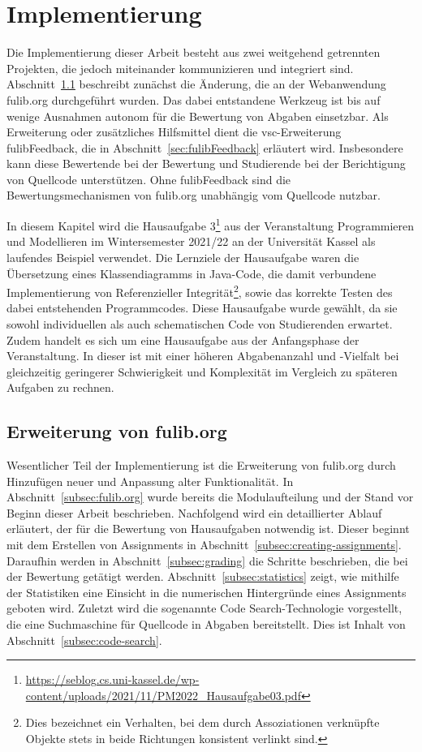 \chapter{Implementierung}\label{ch:implementation}

Die Implementierung dieser Arbeit besteht aus zwei weitgehend getrennten Projekten, die jedoch miteinander kommunizieren und integriert sind.
Abschnitt~\ref{sec:expanding-fulib.org} beschreibt zunächst die Änderung, die an der Webanwendung fulib.org durchgeführt wurden.
Das dabei entstandene Werkzeug ist bis auf wenige Ausnahmen autonom für die Bewertung von Abgaben einsetzbar.
Als Erweiterung oder zusätzliches Hilfsmittel dient die \ac{vsc}-Erweiterung fulibFeedback, die in Abschnitt~\ref{sec:fulibFeedback} erläutert wird.
Insbesondere kann diese Bewertende bei der Bewertung und Studierende bei der Berichtigung von Quellcode unterstützen.
Ohne fulibFeedback sind die Bewertungsmechanismen von fulib.org unabhängig vom Quellcode nutzbar.

In diesem Kapitel wird die Hausaufgabe 3\footnote{
    \url{https://seblog.cs.uni-kassel.de/wp-content/uploads/2021/11/PM2022_Hausaufgabe03.pdf}
} aus der Veranstaltung Programmieren und Modellieren im Wintersemester 2021/22 an der Universität Kassel als laufendes Beispiel verwendet.
Die Lernziele der Hausaufgabe waren die Übersetzung eines Klassendiagramms in Java-Code, die damit verbundene Implementierung von Referenzieller Integrität\footnote{
    Dies bezeichnet ein Verhalten, bei dem durch Assoziationen verknüpfte Objekte stets in beide Richtungen konsistent verlinkt sind.
}, sowie das korrekte Testen des dabei entstehenden Programmcodes.
Diese Hausaufgabe wurde gewählt, da sie sowohl individuellen als auch schematischen Code von Studierenden erwartet.
Zudem handelt es sich um eine Hausaufgabe aus der Anfangsphase der Veranstaltung.
In dieser ist mit einer höheren Abgabenanzahl und -Vielfalt bei gleichzeitig geringerer Schwierigkeit und Komplexität im Vergleich zu späteren Aufgaben zu rechnen.

\section{Erweiterung von fulib.org}\label{sec:expanding-fulib.org}

Wesentlicher Teil der Implementierung ist die Erweiterung von fulib.org durch Hinzufügen neuer und Anpassung alter Funktionalität.
In Abschnitt~\ref{subsec:fulib.org} wurde bereits die Modulaufteilung und der Stand vor Beginn dieser Arbeit beschrieben.
Nachfolgend wird ein detaillierter Ablauf erläutert, der für die Bewertung von Hausaufgaben notwendig ist.
Dieser beginnt mit dem Erstellen von Assignments in Abschnitt~\ref{subsec:creating-assignments}.
Daraufhin werden in Abschnitt~\ref{subsec:grading} die Schritte beschrieben, die bei der Bewertung getätigt werden.
Abschnitt~\ref{subsec:statistics} zeigt, wie mithilfe der Statistiken eine Einsicht in die numerischen Hintergründe eines Assignments geboten wird.
Zuletzt wird die sogenannte Code Search-Technologie vorgestellt, die eine Suchmaschine für Quellcode in Abgaben bereitstellt.
Dies ist Inhalt von Abschnitt~\ref{subsec:code-search}.

